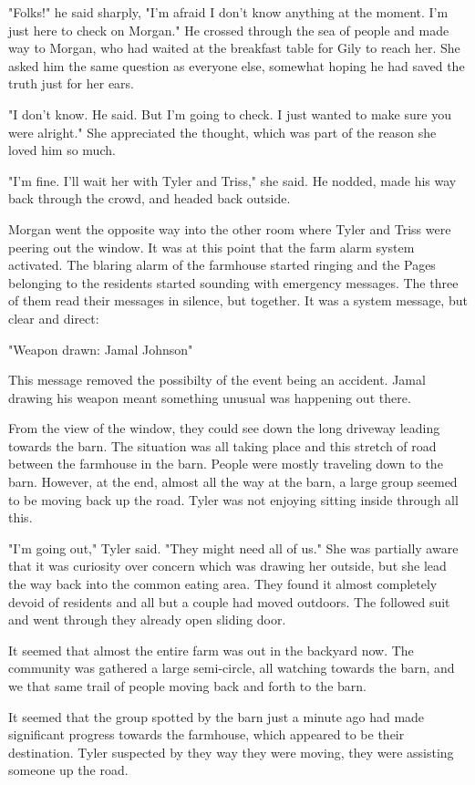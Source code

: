 \documentclass[courier]{sffms}
\begin{document}
"Folks!" he said sharply, "I'm afraid I don't know
anything at the moment. I'm just here to check
on Morgan." He crossed through the sea of
people and made way to Morgan, who had
waited at the breakfast table for Gily to reach
her. She asked him the same question as
everyone else, somewhat hoping he had
saved the truth just for her ears.

"I don't know. He said. But I'm going to check.
I just wanted to make sure you were alright."
She appreciated the thought, which was
part of the reason she loved him so much.

"I'm fine. I'll wait her with Tyler and Triss,"
she said. He nodded, made his way back
through the crowd, and headed back outside.

Morgan went the opposite way into the other
room where Tyler and Triss were peering out
the window. It was at this point
that the farm alarm system activated. The
blaring alarm of the farmhouse started ringing
and the Pages belonging to the residents
started sounding with emergency messages.
The three of them read their messages in
silence, but together. It was a system message,
but clear and direct:

"Weapon drawn: Jamal Johnson"

This message removed the possibilty
of the event being an accident. Jamal drawing
his weapon meant something unusual
was happening out there.

From the view of the window,
they could see down the long driveway leading
towards the barn. The situation was all 
taking place and this stretch of road between
the farmhouse in the barn. People were mostly
traveling down to the barn. However, at the
end, almost all the way at the barn, a large
group seemed to be moving back up the road.
Tyler was not enjoying sitting inside through
all this.

"I'm going out," Tyler said. 
"They might need all of us." She was partially
aware that it was curiosity over concern which
was drawing her outside, but she lead the
way back into the common eating area.
They found it almost completely devoid of
residents and all but a couple had moved
outdoors. The followed suit and went through
they already open sliding door.

It seemed that almost the entire farm was
out in the backyard now. The community was
gathered a large semi-circle, all watching
towards the barn, and we that same trail of
people moving back and forth to the barn.

It seemed that the group spotted by the barn
just a minute ago had made significant 
progress towards the farmhouse, which
appeared to be their destination. Tyler
suspected by they way they were moving,
they were assisting someone up the road.
\end{document}
